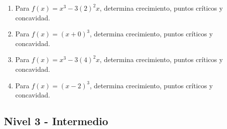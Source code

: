 \documentclass[11pt,a4paper]{article}
\begin{document}
\begin{enumerate}[label=\textbf{E\arabic*.},start=121]
\item Para $f(x)=x^3-3(2)^2x$, determina crecimiento, puntos críticos y concavidad.

\item Para $f(x)=(x+0)^3$, determina crecimiento, puntos críticos y concavidad.

\item Para $f(x)=x^3-3(4)^2x$, determina crecimiento, puntos críticos y concavidad.

\item Para $f(x)=(x-2)^3$, determina crecimiento, puntos críticos y concavidad.

\end{enumerate}

\newpage

\subsection{Nivel 3 - Intermedio}
\end{document}
